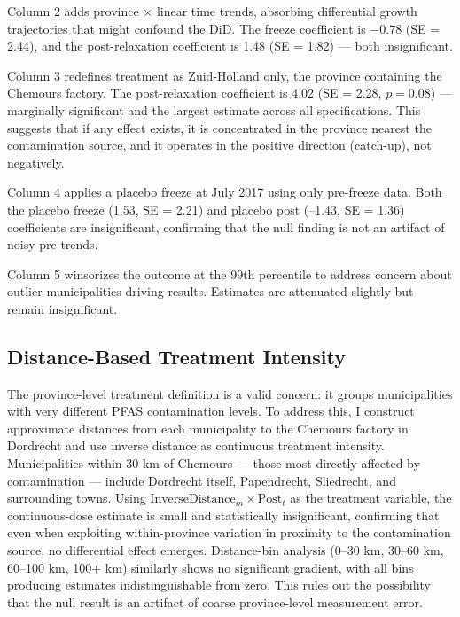 \documentclass[12pt]{article}
\begin{document}
Column 2 adds province $\times$ linear time trends, absorbing differential growth trajectories that might confound the DiD. The freeze coefficient is $-0.78$ (SE = 2.44), and the post-relaxation coefficient is 1.48 (SE = 1.82) --- both insignificant.

Column 3 redefines treatment as Zuid-Holland only, the province containing the Chemours factory. The post-relaxation coefficient is 4.02 (SE = 2.28, $p = 0.08$) --- marginally significant and the largest estimate across all specifications. This suggests that if any effect exists, it is concentrated in the province nearest the contamination source, and it operates in the positive direction (catch-up), not negatively.

Column 4 applies a placebo freeze at July 2017 using only pre-freeze data. Both the placebo freeze (1.53, SE = 2.21) and placebo post (--1.43, SE = 1.36) coefficients are insignificant, confirming that the null finding is not an artifact of noisy pre-trends.

Column 5 winsorizes the outcome at the 99th percentile to address concern about outlier municipalities driving results. Estimates are attenuated slightly but remain insignificant.



\subsection{Distance-Based Treatment Intensity}

The province-level treatment definition is a valid concern: it groups municipalities with very different PFAS contamination levels. To address this, I construct approximate distances from each municipality to the Chemours factory in Dordrecht and use inverse distance as continuous treatment intensity. Municipalities within 30 km of Chemours --- those most directly affected by contamination --- include Dordrecht itself, Papendrecht, Sliedrecht, and surrounding towns. Using $\text{InverseDistance}_m \times \text{Post}_t$ as the treatment variable, the continuous-dose estimate is small and statistically insignificant, confirming that even when exploiting within-province variation in proximity to the contamination source, no differential effect emerges. Distance-bin analysis (0--30 km, 30--60 km, 60--100 km, 100+ km) similarly shows no significant gradient, with all bins producing estimates indistinguishable from zero. This rules out the possibility that the null result is an artifact of coarse province-level measurement error.
\end{document}
